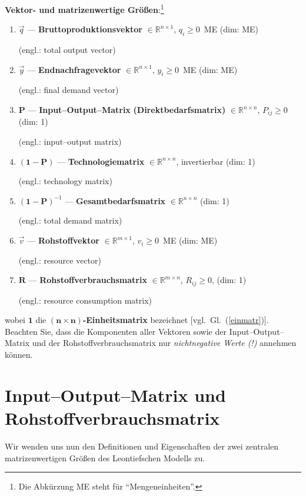 \medskip
\noindent
{\bf Vektor- und matrizenwertige Gr\"o\ss en}:\footnote{Die
Abk\"urzung ME steht f\"ur "`Mengeneinheiten"'.}
%
\begin{enumerate}

\item $\vec{q}$ --- {\bf Bruttoproduktionsvektor}
$\in \mathbb{R}^{n \times 1}$, $q_{i} \geq 0$~ME
\hfill (dim: ME)

(engl.: total output vector)

\item $\vec{y}$ --- {\bf Endnachfragevektor}
$\in \mathbb{R}^{n \times 1}$, $y_{i} \geq 0$~ME
\hfill (dim: ME)

(engl.: final demand vector)

\item $\mathbf{P}$ --- {\bf Input--Output--Matrix}
{\bf (Direktbedarfsmatrix)}
$\in \mathbb{R}^{n \times n}$, $P_{ij} \geq 0$
\hfill (dim: 1)

(engl.: input--output matrix)

\item $(\mathbf{1}-\mathbf{P})$ --- {\bf Technologiematrix}
$\in \mathbb{R}^{n \times n}$, invertierbar
\hfill (dim: 1)

(engl.: technology matrix)

\item $(\mathbf{1}-\mathbf{P})^{-1}$ --- {\bf Gesamtbedarfsmatrix}
$\in \mathbb{R}^{n \times n}$
\hfill (dim: 1)

(engl.: total demand matrix)

\item $\vec{v}$ --- {\bf Rohstoffvektor}
$\in \mathbb{R}^{m \times 1}$, $v_{i} \geq 0$~ME
\hfill (dim: ME)

(engl.: resource vector)

\item $\mathbf{R}$ --- {\bf Rohstoffverbrauchsmatrix}
$\in \mathbb{R}^{m \times n}$, $R_{ij} \geq 0$,
\hfill (dim: 1)

(engl.: resource consumption matrix)

\end{enumerate}
%
wobei $\mathbf{1}$ die {\bf $\boldsymbol{(n \times 
n)}$-Einheitsmatrix}
bezeichnet [vgl.\ Gl.~(\ref{einmatr})]. Beachten Sie, dass die
Komponenten aller Vektoren sowie der Input--Output--Matrix und
der Rohstoffverbrauchsmatrix nur {\em nichtnegative Werte (!)\/}
annehmen k\"onnen.

\section[Input--Output--Matrix und Rohstoffverbrauchsmatrix]%
{Input--Output--Matrix und Rohstoffverbrauchsmatrix}
Wir wenden uns nun den Definitionen und Eigenschaften der zwei
zentralen matrizenwertigen Gr\"o\ss en des Leontiefschen Modells
zu.

